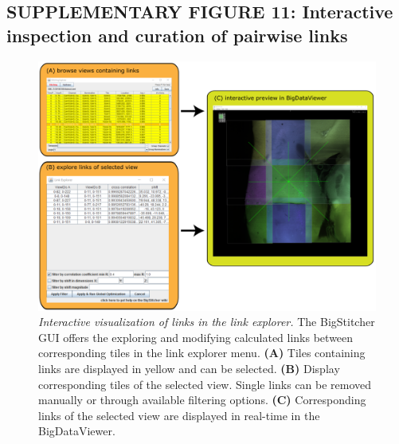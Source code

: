 \documentclass[]{spie}  %
\begin{document}
\subsection*{SUPPLEMENTARY FIGURE 11: Interactive inspection and curation of pairwise links}
\vspace{1mm}
\begin{figure}[h!]
\includegraphics[width=\textwidth]{Supp-Link-Explorer.png}
\vspace{-2.0mm}
\caption{\hspace{-0.5mm} \emph{Interactive visualization of links in the link explorer.} The BigStitcher GUI offers the exploring and modifying calculated links between corresponding tiles in the link explorer menu. \textbf{(A)} Tiles containing links are displayed in yellow and can be selected. \textbf{(B)} Display corresponding tiles of the selected view. Single links can be removed manually or through available filtering options. \textbf{(C)} Corresponding links of the selected view are displayed in real-time in the BigDataViewer.
}
\label{fig:sup-fig-link-explorer}
\end{figure}

\pagebreak
\end{document}
